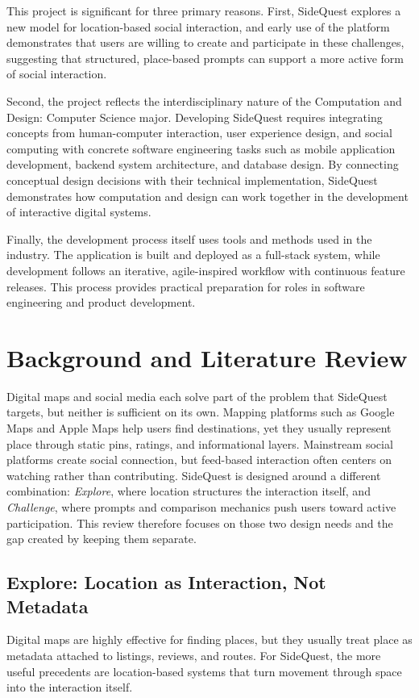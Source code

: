 \documentclass[12pt,a4paper,oneside]{report}
\begin{document}
This project is significant for three primary reasons. First, SideQuest explores a new model for location-based social interaction, and early use of the platform demonstrates that users are willing to create and participate in these challenges, suggesting that structured, place-based prompts can support a more active form of social interaction.

Second, the project reflects the interdisciplinary nature of the Computation and Design: Computer Science major. Developing SideQuest requires integrating concepts from human-computer interaction, user experience design, and social computing with concrete software engineering tasks such as mobile application development, backend system architecture, and database design. By connecting conceptual design decisions with their technical implementation, SideQuest demonstrates how computation and design can work together in the development of interactive digital systems.

Finally, the development process itself uses tools and methods used in the industry. The application is built and deployed as a full-stack system, while development follows an iterative, agile-inspired workflow with continuous feature releases. This process provides practical preparation for roles in software engineering and product development.

\chapter{Background and Literature Review}
\label{ch:litreview}

Digital maps and social media each solve part of the problem that SideQuest targets, but neither is sufficient on its own. Mapping platforms such as Google Maps and Apple Maps help users find destinations, yet they usually represent place through static pins, ratings, and informational layers. Mainstream social platforms create social connection, but feed-based interaction often centers on watching rather than contributing. SideQuest is designed around a different combination: \textit{Explore}, where location structures the interaction itself, and \textit{Challenge}, where prompts and comparison mechanics push users toward active participation. This review therefore focuses on those two design needs and the gap created by keeping them separate.

\section{Explore: Location as Interaction, Not Metadata}
Digital maps are highly effective for finding places, but they usually treat place as metadata attached to listings, reviews, and routes. For SideQuest, the more useful precedents are location-based systems that turn movement through space into the interaction itself.
\end{document}
